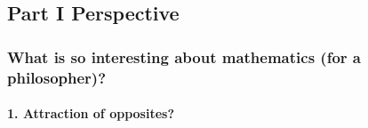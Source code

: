 \subsection{Part I Perspective}
\subsubsection{What is so interesting about mathematics (for a philosopher)?}

\paragraph{1. Attraction of opposites?}